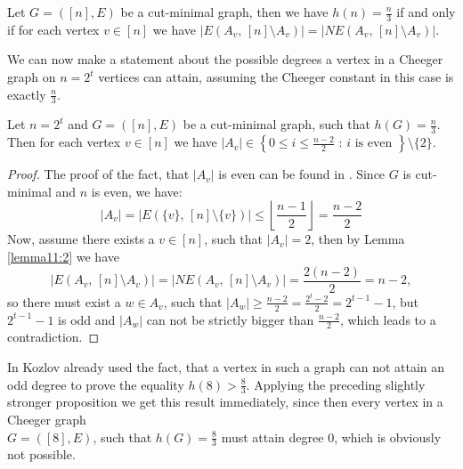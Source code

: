 \begin{lem}\label{lemma11:2}
Let \(G=([n],E)\) be a cut-minimal graph, then we have \(h(n)=\frac{n}{3}\) if and only if for each vertex \(v\in [n]\) we have \(|E(A_v\text{, }[n]\setminus A_v)|=|NE(A_v\text{, }[n]\setminus A_v)|\).
\end{lem}

We can now make a statement about the possible degrees a vertex in a Cheeger graph on \(n=2^t\) vertices can attain, assuming the Cheeger constant in this case is exactly \(\frac{n}{3}\).

\begin{prop}
Let \(n=2^t\) and \(G=([n],E)\) be a cut-minimal graph, such that \(h(G)=\frac{n}{3}\). Then for each vertex \(v\in [n]\) we have \(|A_v|\in\left\{0\leq i\leq\frac{n-2}{2}\text{ : }i\text{ is even }\right\}\setminus\{2\}\).
\begin{proof}
The proof of the fact, that \(|A_v|\) is even can be found in \cite{1}. Since \(G\) is cut-minimal and \(n\) is even, we have:
\[
|A_v|=|E(\{v\}\text{, }[n]\setminus\{v\})|\leq\left\lfloor\frac{n-1}{2}\right\rfloor=\frac{n-2}{2}
\]
Now, assume there exists a \(v\in [n]\), such that \(|A_v|=2\), then by Lemma \ref{lemma11:2} we have
\[
|E(A_v\text{, }[n]\setminus A_v)|=|NE(A_v\text{, }[n]\setminus A_v)|=\frac{2(n-2)}{2}=n-2,
\]
so there must exist a \(w\in A_v\), such that \(|A_w|\geq\frac{n-2}{2}=\frac{2^t-2}{2}=2^{t-1}-1\), but \(2^{t-1}-1\) is odd and \(|A_w|\) can not be strictly bigger than \(\frac{n-2}{2}\), which leads to a contradiction.
\end{proof}
\end{prop}

\begin{expl}
In \cite{1} Kozlov already used the fact, that a vertex in such a graph can not attain an odd degree to prove the equality \(h(8)>\frac{8}{3}\). Applying the preceding slightly stronger proposition we get this result immediately, since then every vertex in a Cheeger graph\\
\(G=([8],E)\), such that \(h(G)=\frac{8}{3}\) must attain degree \(0\), which is obviously not possible.
\end{expl}
